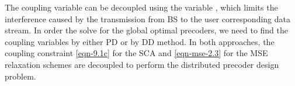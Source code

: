 The coupling variable  can be decoupled using the variable , which limits the interference caused by the transmission from \ac{BS}  to the user  corresponding data stream. In order the solve for the global optimal precoders, we need to find the coupling variables  by either \acl{PD} or by \acl{DD} method. In both approaches, the coupling constraint \eqref{eqn-9.1c} for the \ac{SCA} and \eqref{eqn-mse-2.3} for the \ac{MSE} relaxation schemes are decoupled to perform the distributed precoder design problem. 